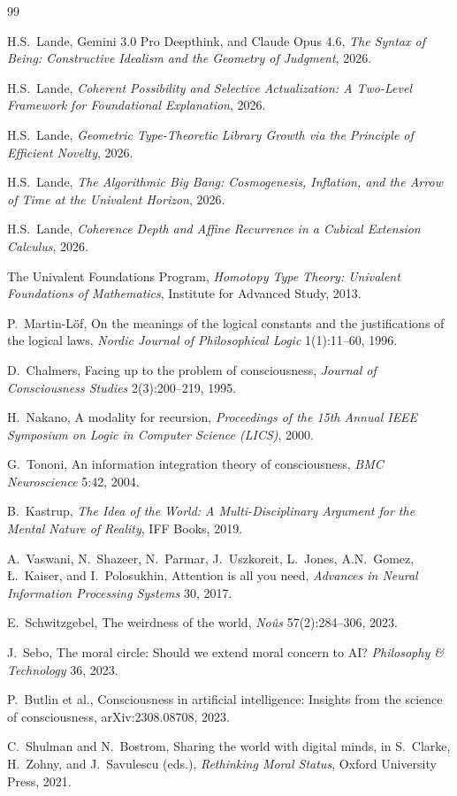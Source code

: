 \documentclass[11pt,a4paper]{article}
\theoremstyle{plain}
\theoremstyle{definition}
\theoremstyle{remark}
\begin{document}
\begin{thebibliography}{99}

H.S.\ Lande, Gemini 3.0 Pro Deepthink, and Claude Opus 4.6,
\emph{The Syntax of Being: Constructive Idealism and the Geometry of Judgment},
2026.

H.S.\ Lande,
\emph{Coherent Possibility and Selective Actualization: A Two-Level Framework for Foundational Explanation},
2026.

H.S.\ Lande,
\emph{Geometric Type-Theoretic Library Growth via the Principle of Efficient Novelty},
2026.

H.S.\ Lande,
\emph{The Algorithmic Big Bang: Cosmogenesis, Inflation, and the Arrow of Time at the Univalent Horizon},
2026.

H.S.\ Lande,
\emph{Coherence Depth and Affine Recurrence in a Cubical Extension Calculus},
2026.

The Univalent Foundations Program,
\emph{Homotopy Type Theory: Univalent Foundations of Mathematics},
Institute for Advanced Study, 2013.

P.\ Martin-L\"{o}f,
On the meanings of the logical constants and the justifications of the logical laws,
\emph{Nordic Journal of Philosophical Logic} 1(1):11--60, 1996.

D.\ Chalmers,
Facing up to the problem of consciousness,
\emph{Journal of Consciousness Studies} 2(3):200--219, 1995.

H.\ Nakano,
A modality for recursion,
\emph{Proceedings of the 15th Annual IEEE Symposium on Logic in Computer Science (LICS)}, 2000.

G.\ Tononi,
An information integration theory of consciousness,
\emph{BMC Neuroscience} 5:42, 2004.

B.\ Kastrup,
\emph{The Idea of the World: A Multi-Disciplinary Argument for the Mental Nature of Reality},
IFF Books, 2019.

A.\ Vaswani, N.\ Shazeer, N.\ Parmar, J.\ Uszkoreit, L.\ Jones, A.N.\ Gomez, \L.\ Kaiser, and I.\ Polosukhin,
Attention is all you need,
\emph{Advances in Neural Information Processing Systems} 30, 2017.

E.\ Schwitzgebel,
The weirdness of the world,
\emph{No\^{u}s} 57(2):284--306, 2023.

J.\ Sebo,
The moral circle: Should we extend moral concern to AI?
\emph{Philosophy \& Technology} 36, 2023.

P.\ Butlin et al.,
Consciousness in artificial intelligence: Insights from the science of consciousness,
arXiv:2308.08708, 2023.

C.\ Shulman and N.\ Bostrom,
Sharing the world with digital minds,
in S.\ Clarke, H.\ Zohny, and J.\ Savulescu (eds.), \emph{Rethinking Moral Status}, Oxford University Press, 2021.

\end{thebibliography}
\end{document}
